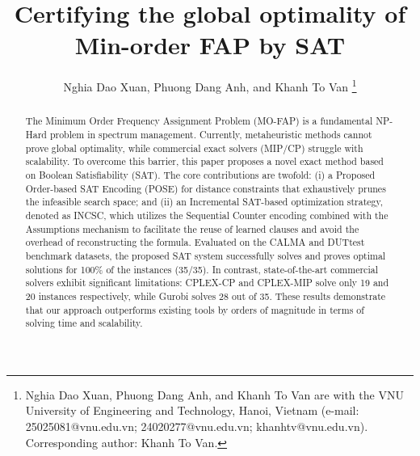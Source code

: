 \documentclass[letterpaper,journal]{IEEEtran}
\begin{document}
\title{Certifying the global optimality of Min-order FAP by SAT}


\author{Nghia Dao Xuan, Phuong Dang Anh, and Khanh To Van
\thanks{Nghia Dao Xuan, Phuong Dang Anh, and Khanh To Van are with the VNU University of Engineering and Technology, Hanoi, Vietnam (e-mail: 25025081@vnu.edu.vn; 24020277@vnu.edu.vn; khanhtv@vnu.edu.vn). Corresponding author: Khanh To Van.}%
}



\maketitle

\begin{abstract}
The Minimum Order Frequency Assignment Problem (MO-FAP) is a fundamental NP-Hard problem in spectrum management. Currently, metaheuristic methods cannot prove global optimality, while commercial exact solvers (MIP/CP) struggle with scalability. To overcome this barrier, this paper proposes a novel exact method based on Boolean Satisfiability (SAT). The core contributions are twofold: (i) a Proposed Order-based SAT Encoding (POSE) for distance constraints that exhaustively prunes the infeasible search space; and (ii) an Incremental SAT-based optimization strategy, denoted as INCSC, which utilizes the Sequential Counter encoding combined with the Assumptions mechanism to facilitate the reuse of learned clauses and avoid the overhead of reconstructing the formula. Evaluated on the CALMA and DUTtest benchmark datasets, the proposed SAT system successfully solves and proves optimal solutions for 100\% of the instances (35/35). In contrast, state-of-the-art commercial solvers exhibit significant limitations: CPLEX-CP and CPLEX-MIP solve only 19 and 20 instances respectively, while Gurobi solves 28 out of 35. These results demonstrate that our approach outperforms existing tools by orders of magnitude in terms of solving time and scalability.
\end{abstract}
\end{document}
